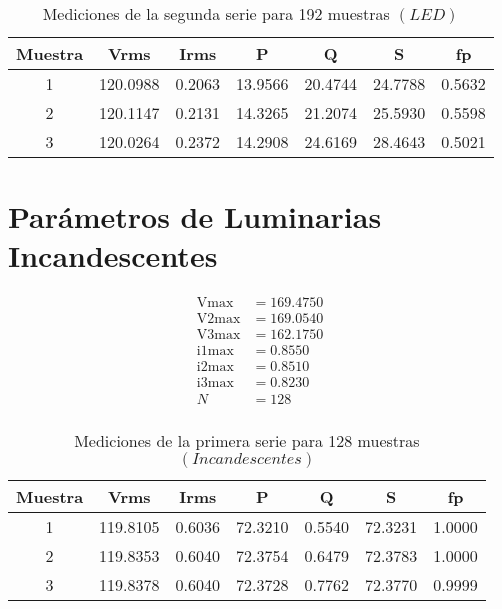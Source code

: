 \documentclass[conference]{IEEEtran}
\theoremstyle{mytheoremstyle}
\theoremstyle{mytheoremstyle}
\theoremstyle{myproblemstyle}
\begin{document}
        \vspace{1cm}

        \begin{table}[h]
        \centering
        \caption{Mediciones de la segunda serie para 192 muestras $(LED)$}
        \begin{tabular}{@{}ccccccc@{}}
        \toprule
        \textbf{Muestra} & \textbf{Vrms} & \textbf{Irms} & \textbf{P} & \textbf{Q} & \textbf{S} & \textbf{fp} \\ \midrule
        1 & 120.0988 & 0.2063 & 13.9566 & 20.4744 & 24.7788 & 0.5632 \\
        2 & 120.1147 & 0.2131 & 14.3265 & 21.2074 & 25.5930 & 0.5598 \\
        3 & 120.0264 & 0.2372 & 14.2908 & 24.6169 & 28.4643 & 0.5021 \\ \bottomrule
        \end{tabular}
        \end{table}



        \section*{Parámetros de Luminarias Incandescentes}
        \begin{align*}
        \text{Vmax} & = 169.4750 \\
        \text{V2max} & = 169.0540 \\
        \text{V3max} & = 162.1750 \\
        \text{i1max} & = 0.8550 \\
        \text{i2max} & = 0.8510 \\
        \text{i3max} & = 0.8230 \\
        N & = 128 \\
        \end{align*}

        \begin{table}[h]
        \centering
        \caption{Mediciones de la primera serie para 128 muestras $(Incandescentes)$}
        \begin{tabular}{@{}ccccccc@{}}
        \toprule
        \textbf{Muestra} & \textbf{Vrms} & \textbf{Irms} & \textbf{P} & \textbf{Q} & \textbf{S} & \textbf{fp} \\ \midrule
        1 & 119.8105 & 0.6036 & 72.3210 & 0.5540 & 72.3231 & 1.0000 \\
        2 & 119.8353 & 0.6040 & 72.3754 & 0.6479 & 72.3783 & 1.0000 \\
        3 & 119.8378 & 0.6040 & 72.3728 & 0.7762 & 72.3770 & 0.9999 \\ \bottomrule
        \end{tabular}
        \end{table}
\end{document}
